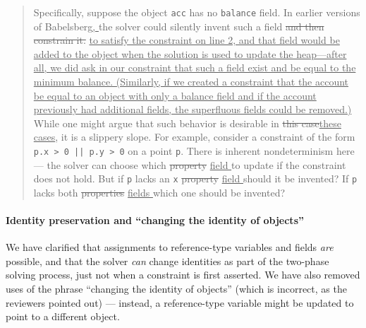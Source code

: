 \documentclass[10pt,twocolumn]{article}
\providecommand{\DIFaddtex}[1]{{\protect\color{BLUE}\uline{#1}}} %
\providecommand{\DIFdeltex}[1]{{\protect\color{gray}\sout{#1}}}                      %
\providecommand{\DIFaddbegin}{} %
\providecommand{\DIFaddend}{} %
\providecommand{\DIFdelbegin}{} %
\providecommand{\DIFdelend}{} %
\providecommand{\DIFadd}[1]{\texorpdfstring{\DIFaddtex{#1}}{#1}} %
\providecommand{\DIFdel}[1]{\texorpdfstring{\DIFdeltex{#1}}{}} %
\begin{document}
\begin{quote}
Specifically, suppose the object \verb!acc! has no \verb!balance!
field.  In earlier versions of Babelsberg\DIFaddbegin \DIFadd{, }\DIFaddend the solver could silently
invent such a field \DIFdelbegin \DIFdel{and then constrain it. }\DIFdelend \DIFaddbegin \DIFadd{to satisfy the constraint on line 2, and that field
would be added to the object when the solution is used to update the
heap---after all, we did ask in our constraint that such a field exist
and be equal to the minimum balance. (Similarly, if we created a
constraint that the account be equal to an object with only a balance
field and if the account previously had additional fields, the superfluous
fields could be removed.) 
}\DIFaddend While one might argue that such behavior is desirable in \DIFdelbegin \DIFdel{this case}\DIFdelend \DIFaddbegin \DIFadd{these
cases}\DIFaddend , it is a slippery slope.  For example, consider a constraint of
the form \verb!p.x > 0 || p.y > 0!  on a point \verb!p!.  There is
inherent nondeterminism here --- the solver can choose which \DIFdelbegin \DIFdel{property }\DIFdelend \DIFaddbegin \DIFadd{field }\DIFaddend to
update if the constraint does not hold.  But if \verb!p! lacks an
\verb!x!  \DIFdelbegin \DIFdel{property }\DIFdelend \DIFaddbegin \DIFadd{field }\DIFaddend should it be invented?  If \verb!p! lacks both \DIFdelbegin \DIFdel{properties }\DIFdelend \DIFaddbegin \DIFadd{fields
}\DIFaddend which one should be invented?
\end{quote}

\paragraph{Identity preservation and ``changing the identity of objects''}
We have clarified that assignments to reference-type
variables and fields \emph{are} possible, and that the solver
\emph{can} change identities as part of the two-phase solving
process, just not when a constraint is first asserted. We have also
removed uses of the phrase ``changing the identity of objects'' (which
is incorrect, as the reviewers pointed out) --- instead, a
reference-type variable might be updated to point to a different object.
\end{document}
